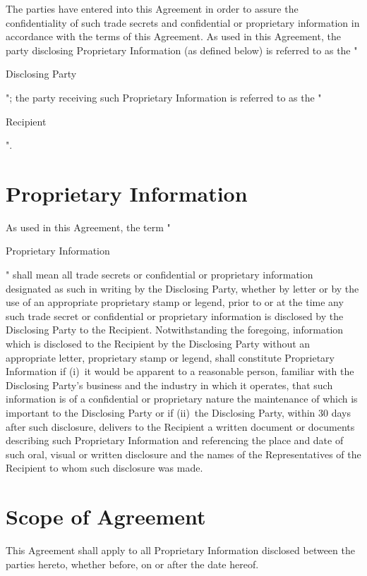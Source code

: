 \documentclass[8pt]{article}
\begin{document}
The parties have entered into this Agreement in order to assure the confidentiality of such trade secrets and confidential or proprietary information in accordance with the terms of this Agreement.  As used in this Agreement, the party disclosing Proprietary Information (as defined below) is referred to as the "\begin{bf}Disclosing Party\end{bf}"; the party receiving such Proprietary Information is referred to as the "\begin{bf}Recipient\end{bf}".

\section{Proprietary Information}
As used in this Agreement, the term "\begin{bf}Proprietary Information\end{bf}" shall mean all trade secrets or confidential or proprietary information designated as such in writing by the Disclosing Party, whether by letter or by the use of an appropriate proprietary stamp or legend, prior to or at the time any such trade secret or confidential or proprietary information is disclosed by the Disclosing Party to the Recipient. Notwithstanding the foregoing, information which is disclosed to the Recipient by the Disclosing Party without an appropriate letter, proprietary stamp or legend, shall constitute Proprietary Information if (i) it would be apparent to a reasonable person, familiar with the Disclosing Party’s business and the industry in which it operates, that such information is of a confidential or proprietary nature the maintenance of which is important to the Disclosing Party or if (ii) the Disclosing Party, within 30 days after such disclosure, delivers to the Recipient a written document or documents describing such Proprietary Information and referencing the place and date of such oral, visual or written disclosure and the names of the Representatives of the Recipient to whom such disclosure was made.

\section{Scope of Agreement}
This Agreement shall apply to all Proprietary Information disclosed between the parties hereto, whether before, on or after the date hereof.
\end{document}
